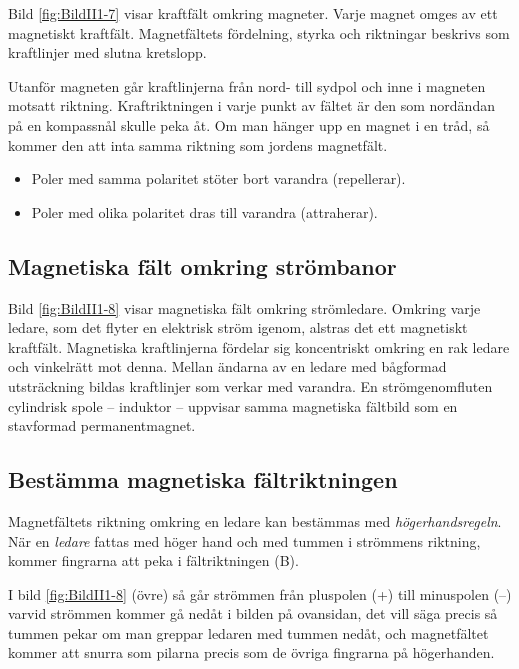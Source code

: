 Bild \ref{fig:BildII1-7} visar kraftfält omkring magneter.
Varje magnet omges av ett magnetiskt kraftfält.
Magnetfältets fördelning, styrka och riktningar beskrivs som kraftlinjer med
slutna kretslopp.

Utanför magneten går kraftlinjerna från nord- till sydpol och inne i magneten
motsatt riktning.
Kraftriktningen i varje punkt av fältet är den som nordändan på en kompassnål
skulle peka åt.
Om man hänger upp en magnet i en tråd, så kommer den att inta samma riktning
som jordens magnetfält.

\begin{itemize}
	\item Poler med samma polaritet stöter bort varandra (repellerar).
	\item Poler med olika polaritet dras till varandra (attraherar).
\end{itemize}


\subsection{Magnetiska fält omkring strömbanor}

Bild \ref{fig:BildII1-8} visar magnetiska fält omkring strömledare.
Omkring varje ledare, som det flyter en elektrisk ström igenom, alstras det ett
magnetiskt kraftfält.
Magnetiska kraftlinjerna fördelar sig koncentriskt omkring en rak ledare och
vinkelrätt mot denna.
Mellan ändarna av en ledare med bågformad utsträckning bildas kraftlinjer som
verkar med varandra.
En strömgenomfluten cylindrisk spole -- induktor -- uppvisar samma magnetiska
fältbild som en stavformad permanentmagnet.

\subsection{Bestämma magnetiska fältriktningen}

Magnetfältets riktning omkring en ledare kan bestämmas med
\emph{högerhandsregeln}.
När en \emph{ledare} fattas med höger hand och med tummen i strömmens
riktning, kommer fingrarna att peka i fältriktningen (B).

I bild \ref{fig:BildII1-8} (övre) så går strömmen från pluspolen (+) till
minuspolen (--) varvid strömmen kommer gå nedåt i bilden på ovansidan,
det vill säga precis så tummen pekar om man greppar ledaren med tummen nedåt,
och magnetfältet kommer att snurra som pilarna precis som de övriga fingrarna
på högerhanden.

